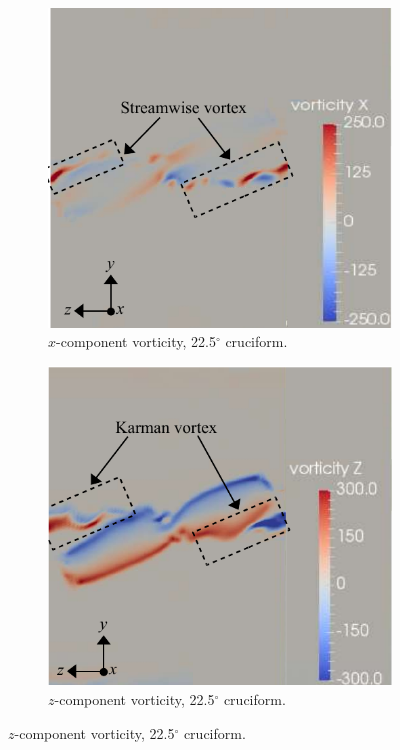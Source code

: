 \documentclass[oneside]{utmthesis}
\begin{document}
\begin{figure}[H]
  \centering
  \begin{subfigure}[h]{0.48\textwidth}
    \centering
    \includegraphics[width=1\textwidth]{figs/vorx225}
    \caption{$x$-component vorticity, 22.5$^{\circ}$ cruciform.}
    \label{fig:vorx225}
  \end{subfigure}
  \hfill
  \begin{subfigure}[h]{0.48\textwidth}
    \centering
    \includegraphics[width=1\textwidth]{figs/vorz225}
    \caption{$z$-component vorticity, 22.5$^{\circ}$ cruciform.}
    \label{fig:vorz225}
  \end{subfigure}


\end{figure}
\end{document}
